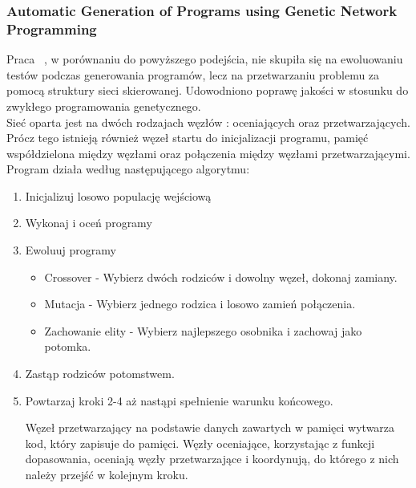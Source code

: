 \documentclass[twoside,a4paper,10]{book}
\begin{document}
\subsubsection{Automatic Generation of Programs using Genetic Network Programming} 
Praca ~\citep{networkProg}, w porównaniu do powyższego podejścia, nie skupiła się na ewoluowaniu testów podczas generowania programów, lecz na przetwarzaniu problemu za pomocą struktury sieci skierowanej. Udowodniono poprawę jakości w stosunku do zwykłego programowania genetycznego. \\
Sieć oparta jest na dwóch rodzajach węzłów : oceniających oraz przetwarzających.  Prócz tego istnieją również węzeł startu do inicjalizacji programu, pamięć współdzielona między węzłami oraz połączenia między węzłami przetwarzającymi.  Program działa według następującego algorytmu: 
\begin{enumerate}
\item Inicjalizuj losowo populację wejściową 
\item Wykonaj i oceń programy
\item Ewoluuj programy 
\begin{itemize}
\item Crossover - Wybierz dwóch rodziców i dowolny węzeł, dokonaj zamiany.
\item  Mutacja - Wybierz jednego rodzica i losowo zamień połączenia. 
\item Zachowanie elity  - Wybierz najlepszego osobnika i zachowaj jako potomka. 
\end{itemize}
\item Zastąp rodziców potomstwem. 
\item Powtarzaj kroki 2-4 aż nastąpi spełnienie warunku końcowego.

Węzeł przetwarzający na podstawie danych zawartych w pamięci wytwarza kod, który zapisuje do pamięci. Węzły oceniające, korzystając z funkcji dopasowania, oceniają węzły przetwarzające i koordynują, do którego z nich należy przejść w kolejnym kroku. 
\end{enumerate}
\end{document}
